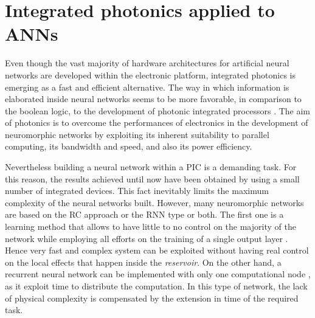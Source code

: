 \clearpage
\section{Integrated photonics applied to ANNs}
\label{sec:Integrated_photonics_applied_to_ANNs}
Even though the vast majority of hardware architectures for artificial neural networks are developed within the electronic platform, integrated photonics is emerging as a fast and efficient alternative.
The way in which information is elaborated inside neural networks seems to be more favorable, in comparison to the boolean logic, to the development of photonic integrated processors \cite{shastri2017emergence}.
The aim of photonics is to overcome the performances of electronics in the development of neuromorphic networks by exploiting its inherent suitability to parallel computing, its bandwidth and speed, and also its power efficiency.

Nevertheless building a neural network within a \ac{PIC} is a demanding task.
For this reason, the results achieved until now have been obtained by using a small number of integrated devices.
This fact inevitably limits the maximum complexity of the neural networks built.
However, many neuromorphic networks are based on the \acf{RC} approach or the \acf{RNN} type or both.
The first one is a learning method that allows to have little to no control on the majority of the network while employing all efforts on the training of a single output layer \cite{van2017advances, haynes2015reservoir}.
Hence very fast and complex system can be exploited without having real control on the local effects that happen inside the \textit{reservoir}.
On the other hand, a recurrent neural network can be implemented with only one computational node \cite{dejonckheere2014all, haynes2015reservoir}, as it exploit time to distribute the computation.
In this type of network, the lack of physical complexity is compensated by the extension in time of the required task.

